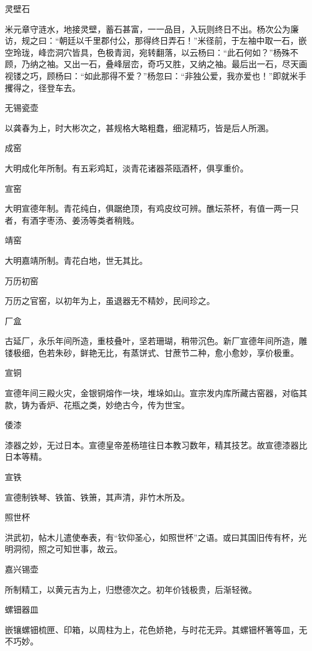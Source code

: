\documentclass[a4paper,12pt,UTF8,twoside]{ctexbook}
\begin{document}
    灵壁石
    
    米元章守涟水，地接灵壁，蓄石甚富，一一品目，入玩则终日不出。杨次公为廉访，规之曰：“朝廷以千里郡付公，那得终日弄石！”米径前，于左袖中取一石，嵌空玲珑，峰峦洞穴皆具，色极青润，宛转翻落，以云杨曰：“此石何如？”杨殊不顾，乃纳之袖。又出一石，叠峰层峦，奇巧又胜，又纳之袖。最后出一石，尽天画视镂之巧，顾杨曰：“如此那得不爱？”杨忽曰：“非独公爱，我亦爱也！”即就米手攫得之，径登车去。
    
    无锡瓷壶
    
    以龚春为上，时大彬次之，甚规格大略粗蠢，细泥精巧，皆是后人所溷。
    
    成窑
    
    大明成化年所制。有五彩鸡缸，淡青花诸器茶瓯酒杯，俱享重价。
    
    宣窑
    
    大明宣德年制。青花纯白，俱踞绝顶，有鸡皮纹可辨。醮坛茶杯，有值一两一只者，有酒字枣汤、姜汤等类者稍贱。
    
    靖窑
    
    大明嘉靖所制。青花白地，世无其比。
    
    万历初窑
    
    万历之官窑，以初年为上，虽退器无不精妙，民间珍之。
    
    厂盒
    
    古延厂，永乐年间所造，重枝叠叶，坚若珊瑚，稍带沉色。新厂宣德年间所造，雕镂极细，色若朱砂，鲜艳无比，有蒸饼式、甘蔗节二种，愈小愈妙，享价极重。
    
    宣铜
    
    宣德年间三殿火灾，金银铜熔作一块，堆垛如山。宣宗发内库所藏古窑器，对临其款，铸为香炉、花瓶之类，妙绝古今，传为世宝。
    
    倭漆
    
    漆器之妙，无过日本。宣德皇帝差杨瑄往日本教习数年，精其技艺。故宣德漆器比日本等精。
    
    宣铁
    
    宣德制铁琴、铁笛、铁箫，其声清，非竹木所及。
    
    照世杯
    
    洪武初，帖木儿遣使奉表，有“钦仰圣心，如照世杯”之语。或曰其国旧传有杯，光明洞彻，照之可知世事，故云。
    
    嘉兴锡壶
    
    所制精工，以黄元吉为上，归懋德次之。初年价钱极贵，后渐轻微。
    
    螺钿器皿
    
    嵌镶螺钿梳匣、印箱，以周柱为上，花色娇艳，与时花无异。其螺钿杯箸等皿，无不巧妙。
    
\end{document}
